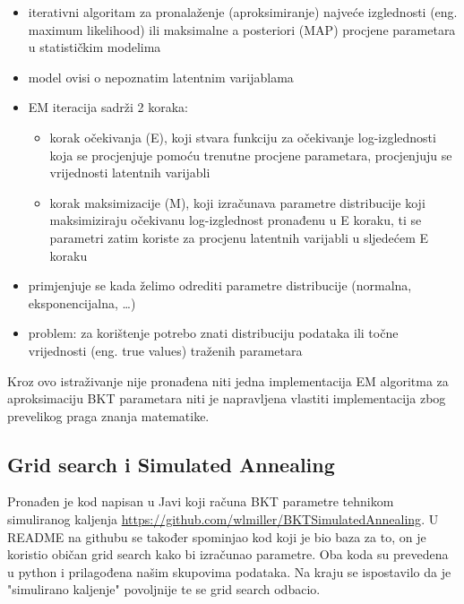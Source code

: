 \documentclass[times, utf8,projekt]{fer}
\begin{document}
\begin{itemize}
	\item iterativni algoritam za pronalaženje (aproksimiranje) najveće izglednosti (eng. maximum likelihood) ili maksimalne a posteriori (MAP) procjene parametara u statističkim modelima
	\item model ovisi o nepoznatim latentnim varijablama
	\item EM iteracija sadrži 2 koraka:
	\begin{itemize}
		\item 	korak očekivanja (E), koji stvara funkciju za očekivanje log-izglednosti koja se procjenjuje pomoću trenutne procjene parametara, procjenjuju se vrijednosti latentnih varijabli
		\item 	korak maksimizacije (M), koji izračunava parametre distribucije koji maksimiziraju očekivanu log-izglednost pronađenu u E koraku, ti se parametri zatim koriste za procjenu latentnih varijabli u sljedećem E koraku
	\end{itemize}
	
	\item primjenjuje se kada želimo odrediti parametre distribucije (normalna, eksponencijalna, …)
	\item problem: za korištenje potrebo znati distribuciju podataka ili točne vrijednosti (eng. true values) traženih parametara
	
\end{itemize}
Kroz ovo istraživanje nije pronađena niti jedna implementacija EM algoritma za aproksimaciju BKT parametara niti je napravljena vlastiti implementacija zbog prevelikog praga znanja matematike.

\subsection{Grid search i Simulated Annealing}
Pronađen je kod napisan u Javi koji računa BKT parametre tehnikom simuliranog kaljenja \url{https://github.com/wlmiller/BKTSimulatedAnnealing}. U README na githubu se također spominjao kod koji je bio baza za to, on je koristio običan grid search kako bi izračunao parametre. Oba koda su prevedena u python i prilagođena našim skupovima podataka. Na kraju se ispostavilo da je "simulirano kaljenje" povoljnije te se grid search odbacio.
\end{document}
